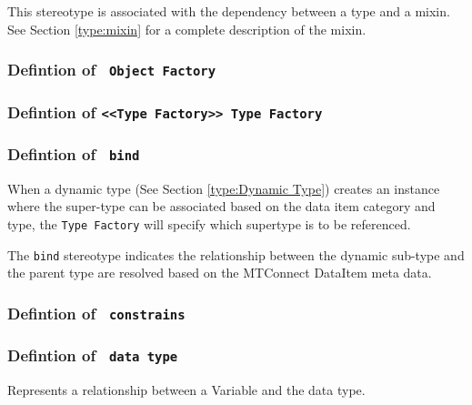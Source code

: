 \FloatBarrier

This stereotype is associated with the dependency between a type and a mixin. See Section \ref{type:mixin} for a complete 
description of the mixin.

\FloatBarrier
\subsubsection{Defintion of \texttt{ Object Factory}} \label{type:Object Factory}

\FloatBarrier



\FloatBarrier
\subsubsection{Defintion of \texttt{<<Type Factory>> Type Factory}} \label{type:Type Factory}

\FloatBarrier



\FloatBarrier
\subsubsection{Defintion of \texttt{ bind}} \label{type:bind}

\FloatBarrier

When a dynamic type (See Section \ref{type:Dynamic Type}) creates an instance where the super-type
can be associated based on the data item category and type, the \texttt{Type Factory} will 
specify which supertype is to be referenced.

The \texttt{bind} stereotype indicates the relationship between the dynamic sub-type and the 
parent type are resolved based on the MTConnect DataItem meta data.

\FloatBarrier
\subsubsection{Defintion of \texttt{ constrains}} \label{type:constrains}

\FloatBarrier



\FloatBarrier
\subsubsection{Defintion of \texttt{ data type}} \label{type:data type}

\FloatBarrier

Represents a relationship between a Variable and the data type.

